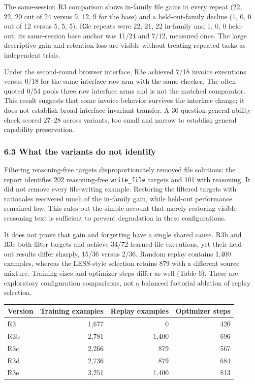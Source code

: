 \documentclass[
  10pt,
]{article}
\newcounter{none} %
\begin{document}
The same-session R3 comparison shows in-family file gains in every
repeat (22, 22, 20 out of 24 versus 9, 12, 9 for the base) and a
held-out-family decline (1, 0, 0 out of 12 versus 5, 5, 5). R3e repeats
were 22, 21, 22 in-family and 1, 0, 0 held-out; its same-session base
anchor was 11/24 and 7/12, measured once. The large descriptive gain and
retention loss are visible without treating repeated tasks as
independent trials.

Under the second-round browser interface, R3e achieved 7/18 invoice
executions versus 0/18 for the same-interface raw arm with the same
checker. The often-quoted 0/54 pools three raw interface arms and is not
the matched comparator. This result suggests that some invoice behavior
survives the interface change; it does not establish broad
interface-invariant transfer. A 30-question general-ability check scored
27--28 across variants, too small and narrow to establish general
capability preservation.

\subsubsection{6.3 What the variants do not
identify}\label{what-the-variants-do-not-identify}

Filtering reasoning-free targets disproportionately removed file
solutions: the report identifies 202 reasoning-free \texttt{write\_file}
targets and 101 with reasoning. It did not remove every file-writing
example. Restoring the filtered targets with rationales recovered much
of the in-family gain, while held-out performance remained low. This
rules out the simple account that merely restoring visible reasoning
text is sufficient to prevent degradation in these configurations.

It does not prove that gain and forgetting have a single shared cause.
R3b and R3c both filter targets and achieve 34/72 learned-file
executions, yet their held-out results differ sharply, 15/36 versus
2/36. Random replay contains 1,400 examples, whereas the LESS-style
selection retains 879 with a different source mixture. Training sizes
and optimizer steps differ as well (Table 6). These are exploratory
configuration comparisons, not a balanced factorial ablation of replay
selection.

{\def\LTcaptype{none} %
\begin{longtable}[]{@{}lrrr@{}}
\toprule\noalign{}
Version & Training examples & Replay examples & Optimizer steps \\
\midrule\noalign{}
\endhead
\bottomrule\noalign{}
\endlastfoot
R3 & 1,677 & 0 & 420 \\
R3b & 2,781 & 1,400 & 696 \\
R3c & 2,266 & 879 & 567 \\
R3d & 2,736 & 879 & 684 \\
R3e & 3,251 & 1,400 & 813 \\
\end{longtable}
}
\end{document}
